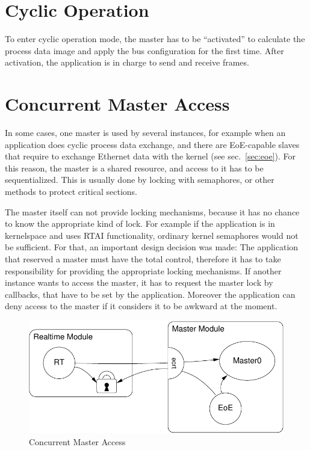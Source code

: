\documentclass[a4paper,12pt,BCOR6mm,bibtotoc,idxtotoc]{scrbook}
\begin{document}

\section{Cyclic Operation}
\label{sec:cyclic}


To enter cyclic operation mode, the master has to be ``activated'' to
calculate the process data image and apply the bus configuration for the first
time. After activation, the application is in charge to send and receive
frames.



\section{Concurrent Master Access}
\label{sec:concurr}

In some cases, one master is used by several instances, for example when an
application does cyclic process data exchange, and there are EoE-capable
slaves that require to exchange Ethernet data with the kernel (see
sec.~\ref{sec:eoe}). For this reason, the master is a shared resource, and
access to it has to be sequentialized. This is usually done by locking with
semaphores, or other methods to protect critical sections.

The master itself can not provide locking mechanisms, because it has no chance
to know the appropriate kind of lock. For example if the application is in
kernelspace and uses RTAI functionality, ordinary kernel semaphores would not
be sufficient. For that, an important design decision was made: The
application that reserved a master must have the total control, therefore it
has to take responsibility for providing the appropriate locking mechanisms.
If another instance wants to access the master, it has to request the master
lock by callbacks, that have to be set by the application. Moreover the
application can deny access to the master if it considers it to be awkward at
the moment.

\begin{figure}[htbp]
  \centering
  \includegraphics[width=.6\textwidth]{images/master-locks}
  \caption{Concurrent Master Access}
  \label{fig:locks}
\end{figure}
\end{document}
